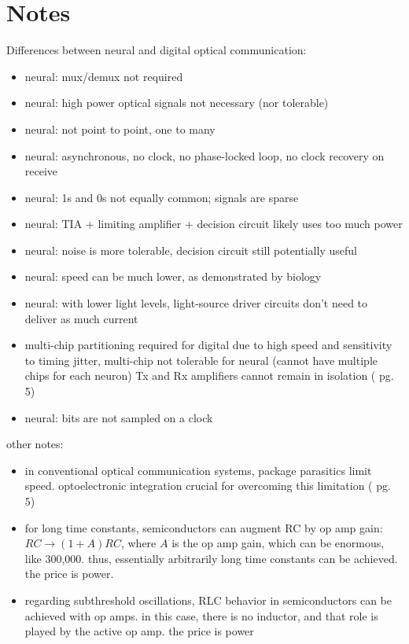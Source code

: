 \documentclass[onecolumn]{article}
\begin{document}

\section{Notes}
Differences between neural and digital optical communication:
\begin{itemize}
\item neural: mux/demux not required
\item neural: high power optical signals not necessary (nor tolerable)
\item neural: not point to point, one to many
\item neural: asynchronous, no clock, no phase-locked loop, no clock recovery on receive
\item neural: 1s and 0s not equally common; signals are sparse
\item neural: TIA + limiting amplifier + decision circuit likely uses too much power
\item neural: noise is more tolerable, decision circuit still potentially useful
\item neural: speed can be much lower, as demonstrated by biology
\item neural: with lower light levels, light-source driver circuits don't need to deliver as much current
\item multi-chip partitioning required for digital due to high speed and sensitivity to timing jitter, multi-chip not tolerable for neural (cannot have multiple chips for each neuron) Tx and Rx amplifiers cannot remain in isolation (\cite{ra2012} pg. 5)
\item neural: bits are not sampled on a clock
\end{itemize}

other notes:
\begin{itemize}
\item in conventional optical communication systems, package parasitics limit speed. optoelectronic integration crucial for overcoming this limitation (\cite{ra2012} pg. 5)
\item for long time constants, semiconductors can augment RC by op amp gain: $RC \rightarrow (1+A)RC$, where $A$ is the op amp gain, which can be enormous, like 300,000. thus, essentially arbitrarily long time constants can be achieved. the price is power.
\item regarding subthreshold oscillations, RLC behavior in semiconductors can be achieved with op amps. in this case, there is no inductor, and that role is played by the active op amp. the price is power
\end{itemize}
\end{document}
